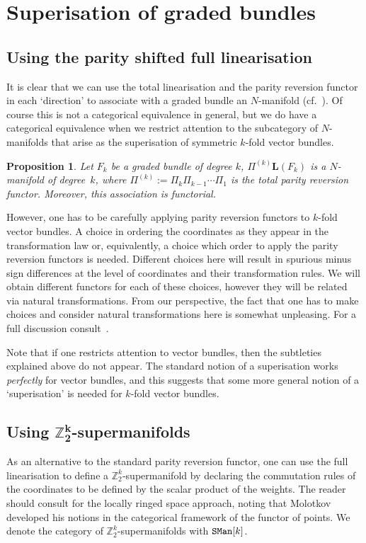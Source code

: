 \documentclass[10pt,a4paper]{amsart}
\newcommand{\catname}[1]{\textnormal{\texttt{#1}}}
\def\Linr{{\mathbf{L}}} %
\numberwithin{equation}{section}
\newtheorem{Proposition}[Theorem]{Proposition}
 { \theoremstyle{definition}
\newtheorem{Definition}[Theorem]{Definition}
\newtheorem{Example}[Theorem]{Example}
\newtheorem{Remark}[Theorem]{Remark} }
\begin{document}
\section{Superisation of graded bundles}\label{sec:superisation}

 \subsection{Using the parity shifted full linearisation}
 It is clear that we can use the total linearisation and the parity reversion functor in each `direction' to associate with a graded bundle an $N$-manifold (cf.~\cite{Grabowski:2006,Voronov:2012}). Of course this is not a categorical equivalence in general, but we do have a categorical equivalence when we restrict attention to the subcategory of $N$-manifolds that arise as the superisation of symmetric $k$-fold vector bundles.

 \begin{Proposition}
 Let $F_{k}$ be a graded bundle of degree $k$, $\Pi^{(k)}\Linr(F_{k})$ is a $N$-manifold of degree~$k$, where $\Pi^{(k)} := \Pi_{k} \Pi_{k-1} \cdots \Pi_{1}$ is the total parity reversion functor. Moreover, this association is functorial.
 \end{Proposition}

However, one has to be carefully applying parity reversion functors to $k$-fold vector bundles. A choice in ordering the coordinates as they appear in the transformation law or, equivalently, a choice which order to apply the parity reversion functors is needed. Dif\/ferent choices here will result in spurious minus sign dif\/ferences at the level of coordinates and their transformation rules. We will obtain dif\/ferent functors for each of these choices, however they will be related via natural transformations. From our perspective, the fact that one has to make choices and consider natural transformations here is somewhat unpleasing. For a full discussion con\-sult~\cite{Grabowski:2006,Voronov:2012}.

Note that if one restricts attention to vector bundles, then the subtleties explained above do not appear. The standard notion of a superisation works \emph{perfectly} for vector bundles, and this suggests that some more general notion of a `superisation' is needed for $k$-fold vector bundles.

\subsection[Using $\mathbb{Z}_{2}^{k}$-supermanifolds]{Using $\boldsymbol{\mathbb{Z}_{2}^{k}}$-supermanifolds}
As an alternative to the standard parity reversion functor, one can use the full linearisation to def\/ine a $\mathbb{Z}_{2}^{k}$-supermanifold by declaring the commutation rules of the coordinates to be def\/ined by the scalar product of the weights. The reader should consult \cite{Covolo:2014a,Covolo:2014b} for the locally ringed space approach, noting that Molotkov \cite{Molotkov:2010} developed his notions in the categorical framework of the functor of points. We denote the category of $\mathbb{Z}_{2}^{k}$-supermanifolds with $\catname{SMan}[k]$.
\end{document}
